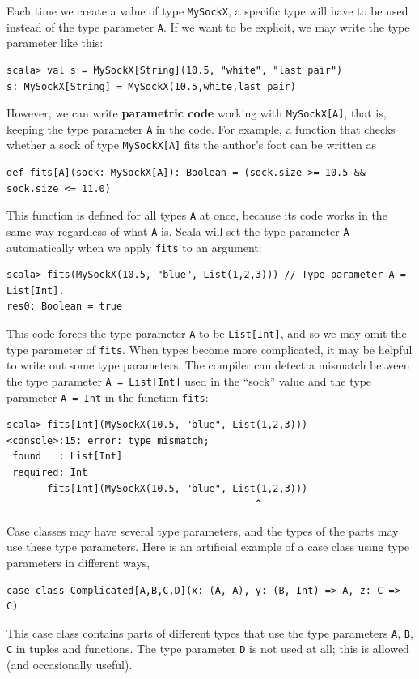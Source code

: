 Each time we create a value of type \lstinline!MySockX!, a specific
type will have to be used instead of the type parameter \lstinline!A!.
If we want to be explicit, we may write the type parameter like this:
\begin{lstlisting}
scala> val s = MySockX[String](10.5, "white", "last pair")
s: MySockX[String] = MySockX(10.5,white,last pair) 
\end{lstlisting}
However, we can write \textbf{parametric code}
working with \lstinline!MySockX[A]!, that is, keeping the type parameter
\lstinline!A! in the code. For example, a function that checks whether
a sock of type \lstinline!MySockX[A]! fits the author\textsf{'}s foot can
be written as
\begin{lstlisting}
def fits[A](sock: MySockX[A]): Boolean = (sock.size >= 10.5 && sock.size <= 11.0)
\end{lstlisting}
This function is defined for all types \lstinline!A! at once, because
its code works in the same way regardless of what \lstinline!A! is.
Scala will set the type parameter \lstinline!A! automatically when
we apply \lstinline!fits! to an argument:
\begin{lstlisting}
scala> fits(MySockX(10.5, "blue", List(1,2,3))) // Type parameter A = List[Int].
res0: Boolean = true
\end{lstlisting}
This code forces the type parameter \lstinline!A! to be \lstinline!List[Int]!,
and so we may omit the type parameter of \lstinline!fits!. When types
become more complicated, it may be helpful to write out some type
parameters. The compiler can detect a mismatch between the type parameter
\lstinline!A = List[Int]! used in the \textsf{``}sock\textsf{''} value and the type
parameter \lstinline!A = Int! in the function \lstinline!fits!:
\begin{lstlisting}
scala> fits[Int](MySockX(10.5, "blue", List(1,2,3)))
<console>:15: error: type mismatch;
 found   : List[Int]
 required: Int
       fits[Int](MySockX(10.5, "blue", List(1,2,3)))
                                           ^ 
\end{lstlisting}

Case classes may have several type parameters, and the types of the
parts may use these type parameters. Here is an artificial example
of a case class using type parameters in different ways,
\begin{lstlisting}
case class Complicated[A,B,C,D](x: (A, A), y: (B, Int) => A, z: C => C)
\end{lstlisting}
This case class contains parts of different types that use the type
parameters \lstinline!A!, \lstinline!B!, \lstinline!C! in tuples
and functions. The type parameter \lstinline!D! is not used at all;
this is allowed (and occasionally useful).

